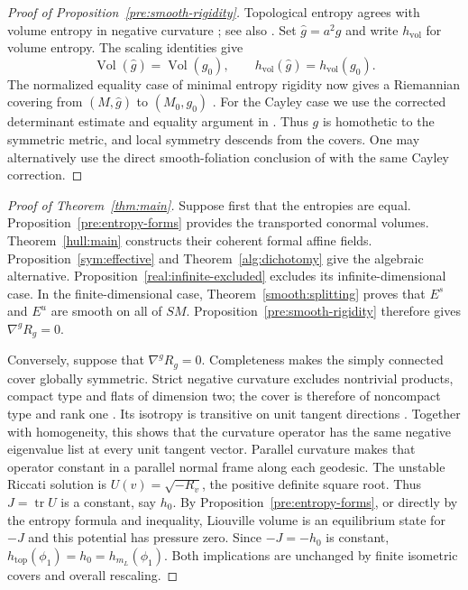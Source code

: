 \documentclass[11pt,a4paper]{article}
\theoremstyle{definition}
\theoremstyle{remark}
\newcommand{\Es}{E^s}
\newcommand{\Eu}{E^u}
\DeclareMathOperator{\tr}{tr}
\DeclareMathOperator{\Vol}{Vol}
\newcommand{\htop}{h_{\mathrm{top}}}
\numberwithin{equation}{section}
\begin{document}
\begin{proof}[Proof of Proposition~\ref{pre:smooth-rigidity}]
Topological entropy agrees with volume entropy in negative
curvature \citep{Manning1979}; see also
\citet[Main Theorem, parts~(a)--(b)]{Leuzinger2006}.
Set $\widehat g=a^2g$ and write $h_{\mathrm{vol}}$ for volume entropy.
The scaling identities give
\[
 \Vol(\widehat g)=\Vol(g_0),\qquad
 h_{\mathrm{vol}}(\widehat g)=h_{\mathrm{vol}}(g_0).
\]
The normalized equality case of minimal entropy rigidity now gives
a Riemannian covering from $(M,\widehat g)$ to $(M_0,g_0)$
\citep[Theorem~8.1 and Proposition~8.2]{BessonCourtoisGallot1995}.
For the Cayley case we use the corrected determinant estimate and
equality argument in \citet[arXiv version~1, final paragraph of
Section~3 and Section~4.4]{Ruan2024}.
Thus $g$ is homothetic to the symmetric metric, and local symmetry
descends from the covers.
One may alternatively use the direct smooth-foliation conclusion
of \citet[Corollary~9.17]{BessonCourtoisGallot1995} with the same
Cayley correction.
\end{proof}

\begin{proof}[Proof of Theorem~\ref{thm:main}]
Suppose first that the entropies are equal.
Proposition~\ref{pre:entropy-forms} provides the transported conormal
volumes. Theorem~\ref{hull:main} constructs their coherent formal
affine fields. Proposition~\ref{sym:effective} and
Theorem~\ref{alg:dichotomy} give the algebraic alternative.
Proposition~\ref{real:infinite-excluded} excludes its
infinite-dimensional case. In the finite-dimensional case,
Theorem~\ref{smooth:splitting} proves that $\Es$ and $\Eu$
are smooth on all of $SM$. Proposition~\ref{pre:smooth-rigidity}
therefore gives $\nabla^gR_g=0$.

Conversely, suppose that $\nabla^gR_g=0$. Completeness makes the
simply connected cover globally symmetric. Strict negative curvature
excludes nontrivial products, compact type and flats of dimension two;
the cover is therefore of noncompact type and rank one
\citep[Theorem~1.3.5, Section~1.6 and Section~3.3]{Gorodski2021}.
Its isotropy is transitive on unit tangent directions
\citep[Section~9, Theorem~9 and its rank-one consequence]{EschenburgSymmetricSpaces}.
Together with homogeneity, this shows that the curvature operator has
the same negative eigenvalue list at every unit tangent vector.
Parallel curvature makes that operator constant in a parallel normal
frame along each geodesic.
The unstable Riccati solution is $U(v)=\sqrt{-R_v}$, the positive
definite square root. Thus $J=\tr U$ is a constant, say $h_0$.
By Proposition~\ref{pre:entropy-forms}, or directly by the entropy
formula and inequality, Liouville volume is an equilibrium state for
$-J$ and this potential has pressure zero. Since $-J=-h_0$ is
constant, $\htop(\phi_1)=h_0=h_{m_L}(\phi_1)$.
Both implications are unchanged by finite isometric covers and
overall rescaling.
\end{proof}



\end{document}
